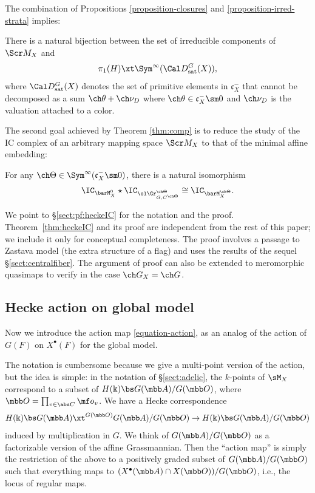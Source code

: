 The combination of Propositions \ref{proposition-closures} and \ref{proposition-irred-strata} implies:

\begin{cor}
\notready
There is a natural bijection between the set of irreducible
components of $\Scr M_X$ and
\[ \pi_1(H) \xt \Sym^\infty(\Cal D^G_{\mathrm{sat}}(X)),\]
where $\Cal D^G_{\mathrm{sat}}(X)$ denotes the set of primitive elements in $\mathfrak c_X^-$ that
cannot be decomposed as a sum $\ch\theta+\ch\nu_D$ where
$\ch\theta\in  \mathfrak c_X^-\sm 0$ and $\ch\nu_D$ is the valuation attached to a color.
\end{cor}



The second goal achieved by Theorem \ref{thm:comp} is to reduce the study of the IC complex of an arbitrary mapping space $\Scr M_X$ to that of the minimal affine embedding:

\begin{thm}
\notready \label{thm:heckeIC}
For any $\ch\Theta \in \Sym^\infty(\mathfrak c_X^- \sm 0)$, there
is a natural isomorphism
\[ \IC_{\barM_X^0} \star \IC_{\ol\Gr^{\ch\Theta}_{G,C^{\ch\Theta}}} \cong
\IC_{\barM^{\ch\Theta}_X}. \]
\end{thm}

We point to \S\ref{sect:pf:heckeIC} for the notation and the proof.
Theorem~\ref{thm:heckeIC} and its proof are independent from the rest of this paper; we
include it only for conceptual completeness.
The proof involves a passage to Zastava model (the extra structure of a flag)
and uses the results of the sequel \S\ref{sect:centralfiber}.
The argument of proof can also be extended to meromorphic quasimaps to verify
\cite[Conjecture 7.3.2]{GN} in the case $\ch G_X = \ch G$.

\subsection{Hecke action on global model} \label{sect:Heckeglob}

Now we introduce the action map \eqref{equation-action}, as an analog of the
action of $G(F)$ on $X^\bullet(F)$ for the global model.

The notation is cumbersome because we give a multi-point version of the action, but
the idea is simple: in the notation of \S\ref{sect:adelic},
the $k$-points of $\sM_X$ correspond to a subset of $H(\Bbbk) \bs G(\mbb A) / G(\mbb O)$, where $\mbb O = \prod_{v\in \abs C} \mf o_v$.
We have a Hecke correspondence
\[ H(\Bbbk) \bs G(\mbb A) \xt^{G(\mbb O)} G(\mbb A) / G(\mbb O) \to H(\Bbbk) \bs G(\mbb A) / G(\mbb O) \]
induced by multiplication in $G$. We think of $G(\mbb A)/G(\mbb O)$ as a
factorizable version of the affine Grassmannian. Then the ``action map''
is simply the restriction of the above to a positively graded subset of $G(\mbb A)/G(\mbb O)$
such that everything maps to $(X^\bullet(\mbb A) \cap X(\mbb O))/G(\mbb O)$, i.e.,
the locus of regular maps.

